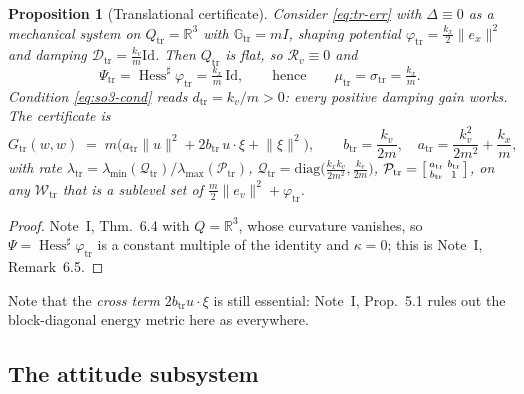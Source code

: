 \documentclass[11pt,a4paper]{article}
\newcommand{\Gm}{\mathbb{G}}
\newcommand{\Rm}{\mathbb{R}}
\newcommand{\Hess}{\operatorname{Hess}}
\newcommand{\Jac}{\mathcal{R}}
\newcommand{\Damp}{\mathcal{D}}
\newcommand{\id}{\mathrm{Id}}
\newcommand{\norm}[1]{\lVert #1 \rVert}
\theoremstyle{plain}
\newtheorem{proposition}[theorem]{Proposition}
\theoremstyle{definition}
\theoremstyle{remark}
\begin{document}
\begin{proposition}[Translational certificate]
\label{prop:tr}
Consider \eqref{eq:tr-err} with $\Delta\equiv0$ as a mechanical system on
$Q_{\mathrm{tr}}=\Rm^3$ with $\Gm_{\mathrm{tr}} = mI$, shaping potential
$\varphi_{\mathrm{tr}} = \tfrac{k_x}{2}\norm{e_x}^2$ and damping
$\Damp_{\mathrm{tr}} = \tfrac{k_v}{m}\id$. Then $Q_{\mathrm{tr}}$ is flat, so
$\Jac_v \equiv 0$ and
\begin{equation}
  \Psi_{\mathrm{tr}} = \Hess^{\sharp}\varphi_{\mathrm{tr}} = \tfrac{k_x}{m}\,\id,
  \qquad\text{hence}\qquad
  \mu_{\mathrm{tr}} = \sigma_{\mathrm{tr}} = \tfrac{k_x}{m}.
\end{equation}
Condition \eqref{eq:so3-cond} reads $d_{\mathrm{tr}} = k_v/m > 0$: \emph{every}
positive damping gain works. The certificate is
\begin{equation}
  G_{\mathrm{tr}}(w,w) \;=\; m\Big( a_{\mathrm{tr}}\norm{u}^2 + 2 b_{\mathrm{tr}}\,u\cdot\xi + \norm{\xi}^2 \Big),
  \qquad
  b_{\mathrm{tr}} = \frac{k_v}{2m},
  \quad
  a_{\mathrm{tr}} = \frac{k_v^2}{2m^2} + \frac{k_x}{m},
  \label{eq:Gtr}
\end{equation}
with rate $\lambda_{\mathrm{tr}} = \lambda_{\min}(\mathcal{Q}_{\mathrm{tr}})/\lambda_{\max}(\mathcal{P}_{\mathrm{tr}})$,
$\mathcal{Q}_{\mathrm{tr}} = \mathrm{diag}\big(\tfrac{k_xk_v}{2m^2},\tfrac{k_v}{2m}\big)$,
$\mathcal{P}_{\mathrm{tr}} = \begin{bsmallmatrix}a_{\mathrm{tr}}&b_{\mathrm{tr}}\\ b_{\mathrm{tr}}&1\end{bsmallmatrix}$,
on any $\mathcal{W}_{\mathrm{tr}}$ that is a sublevel set of
$\tfrac{m}{2}\norm{e_v}^2 + \varphi_{\mathrm{tr}}$.
\end{proposition}

\begin{proof}
Note~I, Thm.~6.4 with $Q=\Rm^3$, whose curvature vanishes, so
$\Psi = \Hess^{\sharp}\varphi_{\mathrm{tr}}$ is a constant multiple of the identity
and $\kappa = 0$; this is Note~I, Remark~6.5.
\end{proof}

Note that the \emph{cross term} $2b_{\mathrm{tr}}u\cdot\xi$ is still essential:
Note~I, Prop.~5.1 rules out the block-diagonal energy metric here as everywhere.

\subsection{The attitude subsystem}
\end{document}
